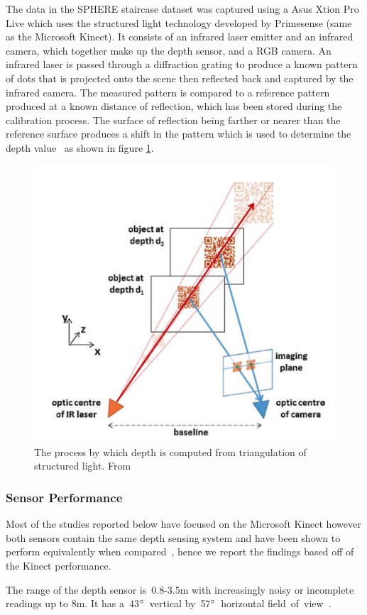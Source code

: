 \documentclass[11pt]{article} %
\begin{document}
The data in the SPHERE staircase dataset was captured using a Asus Xtion Pro Live which uses the structured light technology developed by Primesense (same as the Microsoft Kinect). It consists of an infrared laser emitter and an infrared camera, which together make up the depth sensor, and a RGB camera. An infrared laser is passed through a diffraction grating to produce a known pattern of dots that is projected onto the scene then reflected back and captured by the infrared camera. The measured pattern is compared to a reference pattern produced at a known distance of reflection, which has been stored during the calibration process. The surface of reflection being farther or nearer than the reference surface produces a shift in the pattern which is used to determine the depth value~\cite{Zhang2012a,Khoshelham2012a} as shown in figure \ref{fig:kinectMeasure}.

\begin{figure}
\centering
\includegraphics*[width=0.45\linewidth,clip,trim={1.2cm 1cm 0.7cm 1.5cm}]{kinectMeasure}%
\caption{The process by which depth is computed from triangulation of structured light. From \cite{Han2013}		\label{fig:kinectMeasure}}
\end{figure}

\subsubsection{Sensor Performance}
\label{sec:senPerf}

Most of the studies reported below have focused on the Microsoft Kinect however both sensors contain the same depth sensing system and have been shown to perform equivalently when compared~\cite{Gonzalez-Jorge2013}, hence we report the findings based off of the Kinect performance.

The range of the depth sensor is~0.8-3.5m with increasingly noisy or incomplete readings up to 8m. It has a~43$\degree$~vertical by~57$\degree$~horizontal field~of~view~\cite{Han2013}.
\end{document}
